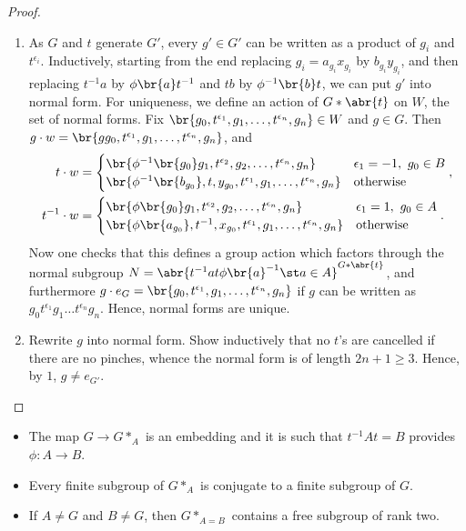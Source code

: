 \begin{proof}
\hfill
\begin{enumerate}
\item As $ G $ and $ t $ generate $ G' $, every $ g' \in G' $ can be written as a product of $ g_i $ and $ t^{\epsilon_i} $. Inductively, starting from the end replacing $ g_i = a_{g_i}x_{g_i} $ by $ b_{g_i}y_{g_i} $, and then replacing $ t^{-1}a $ by $ \phi\br{a}t^{-1} $ and $ tb $ by $ \phi^{-1}\br{b}t $, we can put $ g' $ into normal form. For uniqueness, we define an action of $ G * \abr{t} $ on $ W $, the set of normal forms. Fix $ \br{g_0, t^{\epsilon_1}, g_1, \dots, t^{\epsilon_n}, g_n} \in W $ and $ g \in G $. Then $ g \cdot w = \br{gg_0, t^{\epsilon_1}, g_1, \dots, t^{\epsilon_n}, g_n} $, and
\begin{align*}
t \cdot w & =
\begin{cases}
\br{\phi^{-1}\br{g_0}g_1, t^{\epsilon_2}, g_2, \dots, t^{\epsilon_n}, g_n} & \epsilon_1 = -1, \ g_0 \in B \\
\br{\phi^{-1}\br{b_{g_0}}, t, y_{g_0}, t^{\epsilon_1}, g_1, \dots, t^{\epsilon_n}, g_n} & \text{otherwise}
\end{cases},
\\
t^{-1} \cdot w & =
\begin{cases}
\br{\phi\br{g_0}g_1, t^{\epsilon_2}, g_2, \dots, t^{\epsilon_n}, g_n} & \epsilon_1 = 1, \ g_0 \in A \\
\br{\phi\br{a_{g_0}}, t^{-1}, x_{g_0}, t^{\epsilon_1}, g_1, \dots, t^{\epsilon_n}, g_n} & \text{otherwise}
\end{cases}.
\end{align*}
Now one checks that this defines a group action which factors through the normal subgroup $ N = \abr{t^{-1}at\phi\br{a}^{-1} \st a \in A}^{G * \abr{t}} $, and furthermore $ g \cdot e_G = \br{g_0, t^{\epsilon_1}, g_1, \dots, t^{\epsilon_n}, g_n} $ if $ g $ can be written as $ g_0t^{\epsilon_1}g_1 \dots t^{\epsilon_n}g_n $. Hence, normal forms are unique.
\item Rewrite $ g $ into normal form. Show inductively that no $ t $'s are cancelled if there are no pinches, whence the normal form is of length $ 2n + 1 \ge 3 $. Hence, by $ 1 $, $ g \ne e_{G'} $.
\end{enumerate}
\end{proof}

\begin{corollary}
\hfill
\begin{itemize}
\item The map $ G \to G *_A $ is an embedding and it is such that $ t^{-1}At = B $ provides $ \phi : A \to B $.
\item Every finite subgroup of $ G *_A $ is conjugate to a finite subgroup of $ G $.
\item If $ A \ne G $ and $ B \ne G $, then $ G *_{A = B} $ contains a free subgroup of rank two.
\end{itemize}
\end{corollary}

